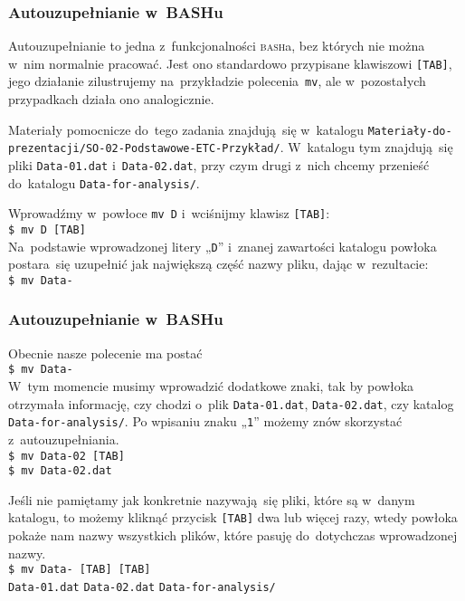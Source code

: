 \documentclass[10pt,t]{beamer}
\begin{document}
\begin{frame}
  \frametitle{Autouzupełnianie w~BASHu}


  Autouzupełnianie to jedna z~funkcjonalności \textsc{bash}a, bez których
  nie można w~nim normalnie pracować. Jest ono standardowo przypisane
  klawiszowi \texttt{[TAB]}, jego działanie zilustrujemy na~przykładzie
  polecenia~\texttt{mv}, ale w~pozostałych przypadkach działa ono
  analogicznie.

  Materiały pomocnicze do~tego zadania znajdują~się w~katalogu
  \texttt{Materiały-do-prezentacji/SO-02-Podstawowe-ETC-Przykład/}.
  W~katalogu tym znajdują~się pliki \texttt{Data-01.dat}
  i~\texttt{Data-02.dat}, przy czym drugi z~nich chcemy przenieść
  do~katalogu \texttt{Data-for-analysis/}.

  Wprowadźmy w~powłoce \texttt{mv D} i~wciśnijmy klawisz \texttt{[TAB]}: \\
  \texttt{\$ mv D [TAB]} \\
  Na~podstawie wprowadzonej litery „\texttt{D}” i~znanej zawartości
  katalogu powłoka postara~się uzupełnić jak największą część nazwy pliku,
  dając w~rezultacie: \\
  \texttt{\$ mv Data-}

\end{frame}





\begin{frame}
  \frametitle{Autouzupełnianie w~BASHu}


  Obecnie nasze polecenie ma postać \\
  \texttt{\$ mv Data-} \\
  W~tym momencie musimy wprowadzić dodatkowe znaki, tak by powłoka otrzymała
  informację, czy chodzi o~plik \texttt{Data-01.dat},
  \texttt{Data-02.dat}, czy katalog \texttt{Data-for-analysis/}. Po wpisaniu
  znaku „\texttt{1}” możemy znów skorzystać z~autouzupełniania. \\
  \texttt{\$ mv Data-02 [TAB]} \\
  \texttt{\$ mv Data-02.dat}

  Jeśli nie pamiętamy jak konkretnie nazywają~się pliki, które są w~danym
  katalogu, to możemy kliknąć przycisk \texttt{[TAB]} dwa lub więcej razy,
  wtedy powłoka pokaże nam nazwy wszystkich plików, które pasuję
  do~dotychczas wprowadzonej nazwy. \\
  \texttt{\$ mv Data- [TAB] \hspace{-1em} [TAB]} \\
  \texttt{Data-01.dat} \quad \texttt{Data-02.dat} \quad \texttt{Data-for-analysis/}

\end{frame}
\end{document}
